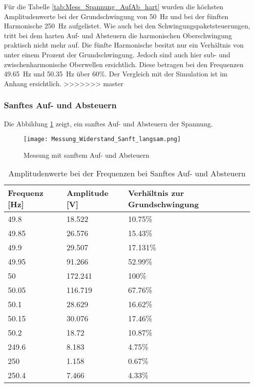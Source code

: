 Für die Tabelle \ref{tab:Mess_Spannung_AufAb_hart} wurden die höchsten Amplitudenwerte bei der Grundschwingung von \SI{50}{Hz} und bei der fünften Harmonische \SI{250}{Hz} aufgelistet.
Wie auch bei den Schwingungspaketsteuerungen, tritt bei dem harten Auf- und Absteuern die harmonischen Oberschwingung praktisch nicht mehr auf. Die fünfte Harmonische besitzt nur ein Verhältnis von unter einem Prozent der Grundschwingung. Jedoch sind auch hier sub- und zwischenharmonische Oberwellen ersichtlich. Diese betragen bei den Frequenzen \SI{49.65}{Hz} und \SI{50.35}{Hz} über 60\%. Der Vergleich mit der Simulation ist im Anhang ersichtlich.
>>>>>>> master

\newpage
\subsubsection*{Sanftes Auf- und Absteuern}
Die Abbildung \ref{fig:Mess_Sanft_langsam} zeigt, ein sanftes Auf- und Absteuern der Spannung.


\begin{figure}[ht!]
	\centering
	\texttt{[image: Messung\_Widerstand\_Sanft\_langsam.png]}	
	\caption{Messung mit sanftem Auf- und Absteuern}\label{fig:Mess_Sanft_langsam}
\end{figure}


\begin{table}[ht!]
	\centering
	\begin{tabular}{|l|l|l|}
		\hline
		Frequenz {[}Hz{]} & Amplitude {[}V{]} & Verhältnis zur Grundschwingung \\ \hline
		49.8              & 18.522            & 10.75\%                        \\ \hline
		49.85             & 26.576            & 15.43\%                        \\ \hline
		49.9              & 29.507            & 17.131\%                       \\ \hline
		49.95             & 91.266            & 52.99\%                        \\ \hline
		50                & 172.241           & 100\%                          \\ \hline
		50.05             & 116.719           & 67.76\%                        \\ \hline
		50.1              & 28.629            & 16.62\%                        \\ \hline
		50.15             & 30.076            & 17.46\%                        \\ \hline
		50.2              & 18.72             & 10.87\%                        \\ \hline
		249.6             & 8.183             & 4.75\%                         \\ \hline
		250               & 1.158             & 0.67\%                         \\ \hline
		250.4             & 7.466             & 4.33\%                         \\ \hline
	\end{tabular}
\caption{Amplitudenwerte bei der Frequenzen bei Sanftes Auf- und Absteuern}\label{tab:Mess_Spannung_AufAb_sanft}
\end{table}


